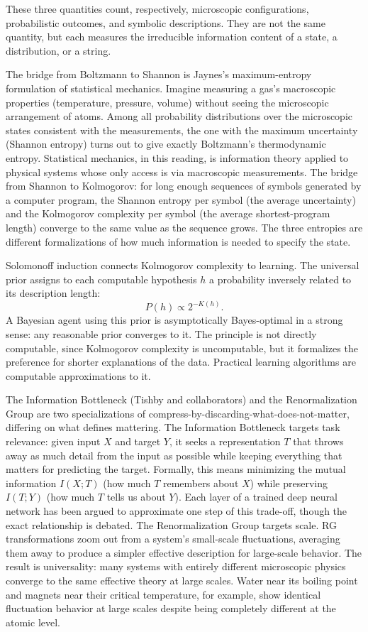 \documentclass[11pt]{article}
\begin{document}
These three quantities count, respectively, microscopic configurations, probabilistic outcomes, and symbolic descriptions. They are not the same quantity, but each measures the irreducible information content of a state, a distribution, or a string.

The bridge from Boltzmann to Shannon is Jaynes's maximum-entropy formulation of statistical mechanics. Imagine measuring a gas's macroscopic properties (temperature, pressure, volume) without seeing the microscopic arrangement of atoms. Among all probability distributions over the microscopic states consistent with the measurements, the one with the maximum uncertainty (Shannon entropy) turns out to give exactly Boltzmann's thermodynamic entropy. Statistical mechanics, in this reading, is information theory applied to physical systems whose only access is via macroscopic measurements. The bridge from Shannon to Kolmogorov: for long enough sequences of symbols generated by a computer program, the Shannon entropy per symbol (the average uncertainty) and the Kolmogorov complexity per symbol (the average shortest-program length) converge to the same value as the sequence grows. The three entropies are different formalizations of how much information is needed to specify the state.

Solomonoff induction connects Kolmogorov complexity to learning. The universal prior \citep{solomonoff1964} assigns to each computable hypothesis $h$ a probability inversely related to its description length:
\begin{equation}
P(h) \propto 2^{-K(h)}.
\end{equation}
A Bayesian agent using this prior is asymptotically Bayes-optimal in a strong sense: any reasonable prior converges to it. The principle is not directly computable, since Kolmogorov complexity is uncomputable, but it formalizes the preference for shorter explanations of the data. Practical learning algorithms are computable approximations to it.

The Information Bottleneck (Tishby and collaborators) and the Renormalization Group are two specializations of compress-by-discarding-what-does-not-matter, differing on what defines mattering. The Information Bottleneck targets task relevance: given input $X$ and target $Y$, it seeks a representation $T$ that throws away as much detail from the input as possible while keeping everything that matters for predicting the target. Formally, this means minimizing the mutual information $I(X;T)$ (how much $T$ remembers about $X$) while preserving $I(T;Y)$ (how much $T$ tells us about $Y$). Each layer of a trained deep neural network has been argued to approximate one step of this trade-off, though the exact relationship is debated. The Renormalization Group targets scale. RG transformations zoom out from a system's small-scale fluctuations, averaging them away to produce a simpler effective description for large-scale behavior. The result is universality: many systems with entirely different microscopic physics converge to the same effective theory at large scales. Water near its boiling point and magnets near their critical temperature, for example, show identical fluctuation behavior at large scales despite being completely different at the atomic level.
\end{document}
